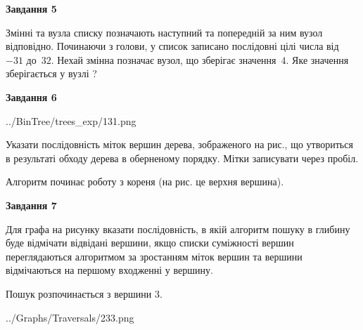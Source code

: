 \documentclass[12pt, ukrainian]{article}
\begin{document}
{\begin {large}
{\begin {center}\textbf{Завдання 5}\end {center}}\par
Змінні  та  вузла списку позначають наступний та попередній за ним вузол відповідно. Починаючи з голови, у список записано послідовні цілі числа від~$-31$ до~$32$. Нехай змінна  позначає вузол, що зберігає значення~$4$.
Яке значення зберігається у вузлі  ?\par
\newpage

{\begin {center}\textbf{Завдання 6}\end {center}}\par

\begin{center}
	{../BinTree/trees_exp/131.png}
\end{center}
Указати послідовність міток вершин дерева, зображеного на рис., що утвориться в результаті обходу дерева в оберненому порядку. Мітки записувати через пробіл.\par Алгоритм починає роботу з кореня (на рис. це верхня вершина).\par
\newpage

{\begin {center}\textbf{Завдання 7}\end {center}}\par
Для графа на рисунку вказати послідовність, в якій алгоритм пошуку в глибину буде відмічати відвідані вершини, якщо списки суміжності вершин переглядаються алгоритмом за зростанням міток вершин та вершини відмічаються на першому вход\-женні у вершину.\par
Пошук розпочинається з вершини 3.\par

\begin{center}
	{../Graphs/Traversals/233.png}
\end{center}\par
\newpage


\end{large}}
\end{document}
